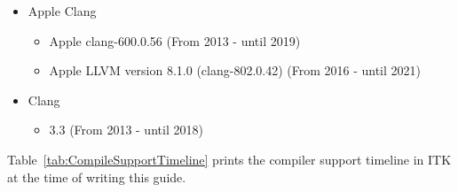\begin{itemize}
\item Apple Clang
  \begin{itemize}
     \item Apple clang-600.0.56 (From 2013 - until 2019) %
     \item Apple LLVM version 8.1.0 (clang-802.0.42)  (From 2016 - until 2021) %
   \end{itemize}
\item Clang
    \begin{itemize}
      \item 3.3 (From 2013 - until 2018) %
    \end{itemize}
\end{itemize}


Table~\ref{tab:CompileSupportTimeline} prints the compiler support timeline in
ITK at the time of writing this guide.

